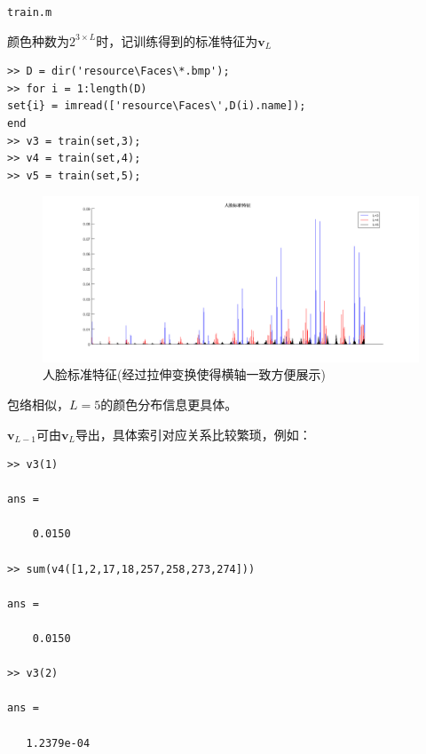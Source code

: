 \documentclass{article}
\numberwithin{figure}{section}
\numberwithin{table}{section}
\numberwithin{listing}{section}
\numberwithin{equation}{section}
\begin{document}
\begin{enumerate}
\begin{enumerate}
                        \begin{listing}[H]
                            \inputminted{matlab}{../train.m}
                            \caption{\texttt{train.m}}
                        \end{listing}

                        颜色种数为$2^{3\times L}$时，记训练得到的标准特征为$\mathbf{v}_L$

                        \begin{verbatim}
>> D = dir('resource\Faces\*.bmp');
>> for i = 1:length(D)
set{i} = imread(['resource\Faces\',D(i).name]);
end
>> v3 = train(set,3);
>> v4 = train(set,4);
>> v5 = train(set,5);
                        \end{verbatim}

                        \begin{figure}[H]
                            \centering
                            \includegraphics[width=\textwidth]{v}
                            \caption{人脸标准特征(经过拉伸变换使得横轴一致方便展示)}
                        \end{figure}

                        包络相似，$L=5$的颜色分布信息更具体。

                        $\mathbf{v}_{L-1}$可由$\mathbf{v}_L$导出，具体索引对应关系比较繁琐，例如：

                        \begin{verbatim}
>> v3(1)

ans =

    0.0150

>> sum(v4([1,2,17,18,257,258,273,274]))

ans =

    0.0150

>> v3(2)

ans =

   1.2379e-04


\end{verbatim}
\end{enumerate}
\end{enumerate}
\end{document}
